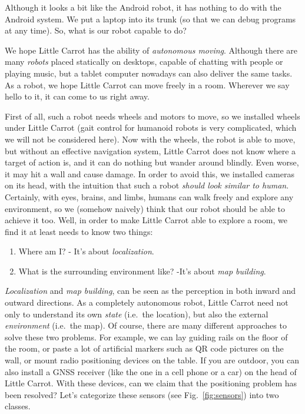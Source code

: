 Although it looks a bit like the Android robot, it has nothing to do with the Android system. We put a laptop into its trunk (so that we can debug programs at any time). So, what is our robot capable to do?

We hope Little Carrot has the ability of \emph{autonomous moving}. Although there are many \emph{robots} placed statically on desktops, capable of chatting with people or playing music, but a tablet computer nowadays can also deliver the same tasks. As a robot, we hope Little Carrot can move freely in a room. Wherever we say hello to it, it can come to us right away.

First of all, such a robot needs wheels and motors to move, so we installed wheels under Little Carrot (gait control for humanoid robots is very complicated, which we will not be considered here). Now with the wheels, the robot is able to move, but without an effective navigation system, Little Carrot does not know where a target of action is, and it can do nothing but wander around blindly. Even worse, it may hit a wall and cause damage. In order to avoid this, we installed cameras on its head, with the intuition that such a robot \emph{should look similar to human}. Certainly, with eyes, brains, and limbs, humans can walk freely and explore any environment, so we (somehow naively) think that our robot should be able to achieve it too. Well, in order to make Little Carrot able to explore a room, we find it at least needs to know two things:

\begin{enumerate}
	\item  Where am I? - It's about \emph{localization}.
	\item What is the surrounding environment like? -It's about \emph{map building}.
\end{enumerate}

\emph{Localization} and \emph{map building}, can be seen as the perception in both inward and outward directions. As a completely autonomous robot, Little Carrot need not only to understand its own \emph{state} (i.e.\ the location), but also the external \emph{environment} (i.e.\ the map). Of course, there are many different approaches to solve these two problems. For example, we can lay guiding rails on the floor of the room, or paste a lot of artificial markers such as QR code pictures on the wall, or mount radio positioning devices on the table. If you are outdoor, you can also install a GNSS receiver (like the one in a cell phone or a car) on the head of Little Carrot. With these devices, can we claim that the positioning problem has been resolved? Let's categorize these sensors (see Fig.~\ref{fig:sensors}) into two classes.

